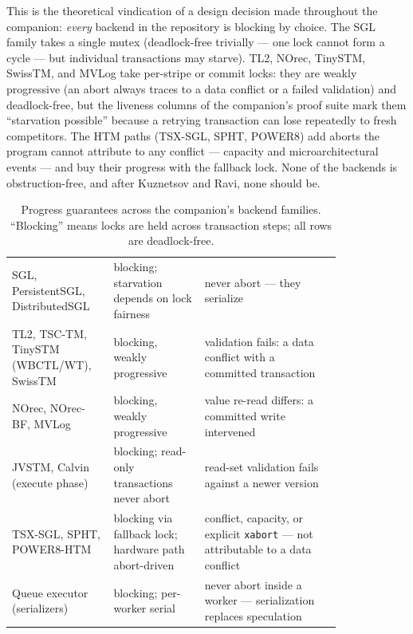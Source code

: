 This is the theoretical vindication of a design decision made throughout
the companion: \emph{every} backend in the repository is blocking by
choice. The SGL family takes a single mutex (deadlock-free trivially ---
one lock cannot form a cycle --- but individual transactions may starve).
TL2, NOrec, TinySTM, SwissTM, and MVLog take per-stripe
or commit locks: they are weakly progressive (an abort always traces to a
data conflict or a failed validation) and deadlock-free, but the liveness
columns of the companion's proof suite mark them ``starvation possible''
because a retrying transaction can lose repeatedly to fresh competitors.
The HTM paths (TSX-SGL, SPHT, POWER8) add aborts the program cannot
attribute to any conflict --- capacity and microarchitectural events ---
and buy their progress with the fallback lock. None of the backends is
obstruction-free, and after Kuznetsov and Ravi, none should be.

\begin{table}[htbp]
\centering
\caption{Progress guarantees across the companion's backend families.
``Blocking'' means locks are held across transaction steps; all rows are
deadlock-free.}
\label{tab:progress-taxonomy}
\renewcommand{\arraystretch}{1.3}
\setlength{\tabcolsep}{4pt}
\begin{tabular}{M{0.22\linewidth} M{0.24\linewidth} M{0.36\linewidth}}
\hline
{} &
 &
 \\
\hline
SGL, PersistentSGL, DistributedSGL &
blocking; starvation depends on lock fairness &
never abort --- they serialize \\
TL2, TSC-TM, TinySTM (WBCTL/WT), SwissTM &
blocking, weakly progressive &
validation fails: a data conflict with a committed transaction \\
NOrec, NOrec-BF, MVLog &
blocking, weakly progressive &
value re-read differs: a committed write intervened \\
JVSTM, Calvin (execute phase) &
blocking; read-only transactions never abort &
read-set validation fails against a newer version \\
TSX-SGL, SPHT, POWER8-HTM &
blocking via fallback lock; hardware path abort-driven &
conflict, capacity, or explicit \texttt{xabort} --- not attributable to a data conflict \\
Queue executor (serializers) &
blocking; per-worker serial &
never abort inside a worker --- serialization replaces speculation \\
\hline
\end{tabular}
\end{table}

